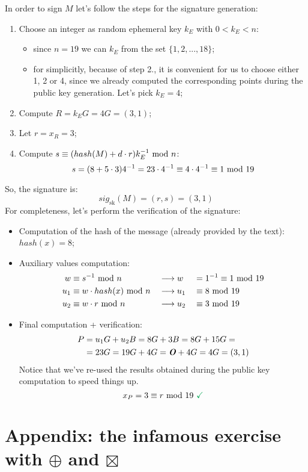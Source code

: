\newpage
\hfill\break
In order to sign $M$ let's follow the steps for the signature generation:
\begin{enumerate}
    \item Choose an integer as random ephemeral key $k_E$ with $0<k_E<n$:
    \begin{itemize}
        \item since $n=19$ we can  $k_E$ from the set $\{1,2,...,18\}$;
        \item for simplicitly, because of step 2., it is convenient for us to choose either 1, 2 or 4, since we already computed the corresponding points during the public key generation. Let's pick $k_E=4$;
    \end{itemize}
    \item Compute $R=k_EG=4G=(3,1)$;
    \item Let $r=x_R=3$;
    \item Compute $s\equiv (hash(M)+d\cdot r)k_E^{-1}\text{ mod } n$:
    $$s=(8+5\cdot3)4^{-1}=23\cdot4^{-1}\equiv4\cdot4^{-1}\equiv1\text{ mod }19$$
\end{enumerate}
So, the signature is:
$$sig_{\text{sk}}(M)=(r,s)=(3,1)$$
For completeness, let's perform the verification of the signature:
\begin{itemize}
    \item Computation of the hash of the message (already provided by the text): $hash(x)=8$;
    \item Auxiliary values computation:
    \begin{alignat*}{3}
        w&\equiv s^{-1}\text{ mod } n&&\longrightarrow w&&=1^{-1}\equiv1\text{ mod }19\\
        u_1&\equiv w\cdot hash(x)\text{ mod } n&&\longrightarrow u_1&&\equiv8\text{ mod }19\\
        u_2&\equiv w\cdot r\text{ mod } n&&\longrightarrow u_2&&\equiv3\text{ mod }19
    \end{alignat*}
    \item Final computation + verification:
    \begin{align*}
        P&=u_1G+u_2B=8G+3B=8G+15G=\\
        &=23G=19G+4G=\text{\textbf{\textit{O}}}+4G=4G=(3,1)
    \end{align*}
    Notice that we've re-used the results obtained during the public key computation to speed things up.
    $$x_P=3\equiv r\mymod 19\text{ \textcolor{Green}{\checkmark}}$$
\end{itemize}

\newpage
\section{Appendix: the infamous exercise with $\oplus$ and $\boxtimes$}
